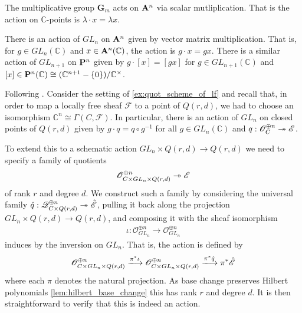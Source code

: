 \documentclass[12pt]{ociamthesis}  %
\begin{document}
\begin{example}
  The multiplicative group $\mathbf G_m$ acts on $\mathbf{A}^{n}_{}$
  via scalar mutliplication. That is the action on $\mathbb C$-points
  is $\lambda\cdot x = \lambda x$.
\end{example}

\begin{example}
  There is an action of $GL_n$ on $\mathbf{A}^{n}_{}$ given by vector
  matrix multiplication. That is, for $g\in GL_n(\mathbb C)$
  and $x\in\mathbf{A}^{n}_{}(\mathbb C)$, the action is $g\cdot x = gx$.
  There is a similar action of $GL_{n+1}$ on $\mathbf{P}^{n}_{}$
  given by $g\cdot[x] = [gx]$ for $g\in GL_{n+1}(\mathbb C)$
  and $[x]\in\mathbf{P}^{n}_{}(\mathbb C) \cong (\mathbb C^{n+1} - \{0\})/\mathbb C^\times$.
\end{example}

\begin{example}\label{ex:lf_action}
  Following \cite[Lemma 8.49]{hoskins2016}.
  Consider the setting of \ref{ex:quot_scheme_of_lf} and recall
  that, in order to map a locally free sheaf $\mathscr F$ to a point of
  $Q(r,d)$, we had to choose an isomorphism
  $\mathbb C^n \cong \Gamma(C,\mathscr F)$. In particular, there
  is an action of $GL_n$ on closed points of $Q(r,d)$
  given by $g\cdot q = q\circ g^{-1}$ for all $g\in GL_n(\mathbb C)$
  and $q : \mathscr O^{\oplus n}_C \twoheadrightarrow \mathscr E$.

  To extend this to a schematic action $GL_n \times Q(r,d) \to Q(r,d)$
  we need to specify a family of quotients
  \begin{align*}
    \mathscr O^{\oplus n}_{C\times GL_n\times Q(r,d)}\twoheadrightarrow \mathscr E
  \end{align*}
  of rank $r$ and degree $d$. We construct such a family by
  considering the universal family $\hat q:\mathscr Q^{\oplus n}_{C\times Q(r,d)}\twoheadrightarrow \hat{\mathscr E}$,
  pulling it back along the projection $GL_n\times Q(r,d)\to Q(r,d)$,
  and composing it with the sheaf isomorphism
  \begin{align*}
    \iota : \mathscr O^{\oplus n}_{GL_n} \to \mathscr O^{\oplus n}_{GL_n}
  \end{align*}
  induces by the inversion on $GL_n$. That is, the action is defined
  by
  \begin{align*}
    \mathscr O^{\oplus n}_{C\times GL_n\times Q(r,d)}
    \xlongrightarrow{\pi^*\iota}
    \mathscr O^{\oplus n}_{C\times GL_n\times Q(r,d)}
    \xlongrightarrow{\pi^*\hat q}
    \pi^*\hat{\mathscr E}
  \end{align*}
  where each $\pi$ denotes the natural projection. As base change
  preserves Hilbert polynomials \ref{lem:hilbert_base_change} this
  has rank $r$ and degree $d$. It is then straightforward to verify
  that this is indeed an action.
\end{example}
\end{document}
